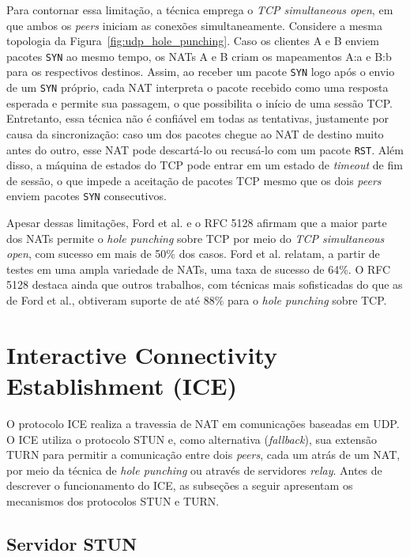 Para contornar essa limitação, a técnica emprega o \textit{TCP simultaneous open}, em que ambos os \textit{peers} iniciam as conexões simultaneamente. Considere a mesma topologia da Figura~\ref{fig:udp_hole_punching}. Caso os clientes A e B enviem pacotes \texttt{SYN} ao mesmo tempo, os NATs A e B criam os mapeamentos A:a e B:b para os respectivos destinos. Assim, ao receber um pacote \texttt{SYN} logo após o envio de um \texttt{SYN} próprio, cada NAT interpreta o pacote recebido como uma resposta esperada e permite sua passagem, o que possibilita o início de uma sessão TCP. Entretanto, essa técnica não é confiável em todas as tentativas, justamente por causa da sincronização: caso um dos pacotes chegue ao NAT de destino muito antes do outro, esse NAT pode descartá-lo ou recusá-lo com um pacote \texttt{RST}. Além disso, a máquina de estados do TCP pode entrar em um estado de \textit{timeout} de fim de sessão, o que impede a aceitação de pacotes TCP mesmo que os dois \textit{peers} enviem pacotes \texttt{SYN} consecutivos.

Apesar dessas limitações, Ford et al. \citep{ford2005peer} e o RFC 5128 \citep{rfc5128} afirmam que a maior parte dos NATs permite o \textit{hole punching} sobre TCP por meio do \textit{TCP simultaneous open}, com sucesso em mais de 50\% dos casos. Ford et al. relatam, a partir de testes em uma ampla variedade de NATs, uma taxa de sucesso de 64\%. O RFC 5128 destaca ainda que outros trabalhos, com técnicas mais sofisticadas do que as de Ford et al., obtiveram suporte de até 88\% para o \textit{hole punching} sobre TCP.

\section{Interactive Connectivity Establishment (ICE)}
\label{sec:ice}

O protocolo ICE \citep{rfc8445} realiza a travessia de NAT em comunicações baseadas em UDP. O ICE utiliza o protocolo STUN e, como alternativa (\textit{fallback}), sua extensão TURN para permitir a comunicação entre dois \textit{peers}, cada um atrás de um NAT, por meio da técnica de \textit{hole punching} ou através de servidores \textit{relay}. Antes de descrever o funcionamento do ICE, as subseções a seguir apresentam os mecanismos dos protocolos STUN e TURN.

\subsection{Servidor STUN}
\label{sec:stun_server}

